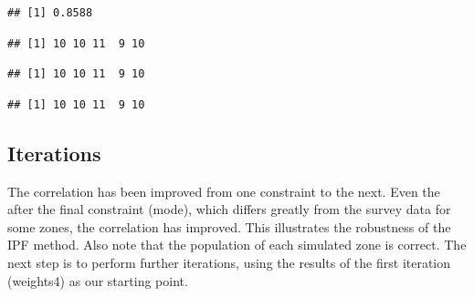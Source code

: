 \begin{Shaded}
\begin{Highlighting}[]
\NormalTok{(}\NormalTok{(}\NormalTok{(}
\end{Highlighting}
\end{Shaded}
\begin{verbatim}
## [1] 0.8588
\end{verbatim}
\begin{Shaded}
\begin{Highlighting}[]
\NormalTok{(USd.agg3[, }\NormalTok{:}\NormalTok{])  }
\end{Highlighting}
\end{Shaded}
\begin{verbatim}
## [1] 10 10 11  9 10
\end{verbatim}
\begin{Shaded}
\begin{Highlighting}[]
\NormalTok{(USd.agg3[, }\NormalTok{:}\NormalTok{])}
\end{Highlighting}
\end{Shaded}
\begin{verbatim}
## [1] 10 10 11  9 10
\end{verbatim}
\begin{Shaded}
\begin{Highlighting}[]
\NormalTok{(USd.agg3[, }\NormalTok{:}\NormalTok{])}
\end{Highlighting}
\end{Shaded}
\begin{verbatim}
## [1] 10 10 11  9 10
\end{verbatim}
\subsection{Iterations}

The correlation has been improved from one constraint to the next. Even
the after the final constraint (mode), which differs greatly from the
survey data for some zones, the correlation has improved. This
illustrates the robustness of the IPF method. Also note that the
population of each simulated zone is correct. The next step is to
perform further iterations, using the results of the first iteration
(weights4) as our starting point.

